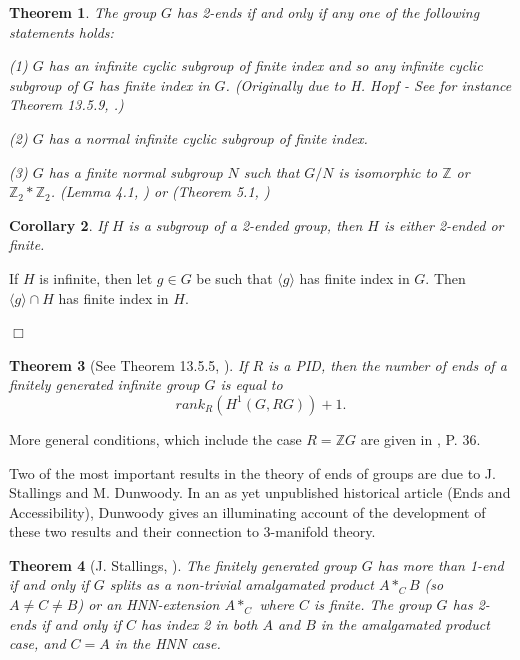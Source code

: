 \documentclass[12pt]{article}
\newtheorem{theorem}{Theorem}[subsection]
\newtheorem{corollary}[theorem]{Corollary}
\newenvironment{proof}{\addvspace{12pt}\noindent{\bf Proof:}}{
$\Box$\par\addvspace{12pt}}
\begin{document}
 \begin{theorem} The group $G$ has 2-ends if and only if any one of the following statements holds:
 
 (1) $G$ has an infinite cyclic subgroup of finite index and so any infinite cyclic subgroup of $G$ has finite index in $G$. (Originally due to H. Hopf \cite{H44} - See for instance Theorem 13.5.9, \cite{G}.)
 
 (2) $G$ has a normal infinite cyclic subgroup of finite index. 
 
 (3) $G$ has a finite normal subgroup $N$ such that $G/N$ is isomorphic to $\mathbb Z$ or $\mathbb Z_2\ast \mathbb Z_2$. (Lemma 4.1, \cite{Wall67}) or (Theorem 5.1, \cite{St68})
 \end{theorem}
 
 \begin{corollary}
 If $H$ is a subgroup of a 2-ended group, then $H$ is either 2-ended or finite. 
 \end{corollary}
 \begin{proof}
 If $H$ is infinite, then let $g\in G$ be such that $\langle g\rangle$ has finite index in $G$. Then $\langle g\rangle\cap H$ has finite index in $H$.
 \end{proof}
 
 
 \begin{theorem} [See Theorem 13.5.5, \cite{G}] \label{HEnds} 
If $R$ is a PID, then the number of ends of a finitely generated infinite group $G$ is equal to 
$$rank_{R}(H^1(G, RG))+1.$$ 
 \end{theorem}
 
 More general conditions, which include the case $R=\mathbb ZG$ are given in \cite{Co73}, P. 36.
 
 Two of the most important results in the theory of ends of groups are due to J. Stallings and M. Dunwoody. In an as yet unpublished historical article (Ends and Accessibility), Dunwoody gives an illuminating account of the development of these two results and their connection to 3-manifold theory. 
 
 \begin{theorem} [J. Stallings, \cite{Stall71}] \label{Stall}   The finitely generated group $G$ has more than 1-end if and only if $G$ splits as a non-trivial amalgamated product $A\ast_CB$ (so $A\ne C\ne B$) or an HNN-extension $A\ast_C$ where $C$ is finite. The group $G$ has 2-ends if and only if $C$ has index 2 in both $A$ and $B$ in the amalgamated product case, and $C=A$ in the HNN case.  
 \end{theorem}
 
\end{document}
